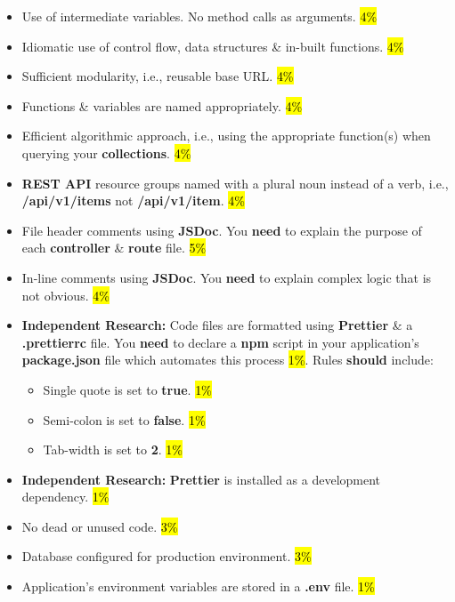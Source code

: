 \documentclass{article}
\begin{document}
\begin{itemize}
  \item Use of intermediate variables. No method calls as arguments. \hl{4\%}
  \item Idiomatic use of control flow, data structures \& in-built functions. \hl{4\%}
  \item Sufficient modularity, i.e., reusable base URL. \hl{4\%}
  \item Functions \& variables are named appropriately. \hl{4\%}
  \item Efficient algorithmic approach, i.e., using the appropriate function(s) when querying your \textbf{collections}. \hl{4\%}
  \item \textbf{REST API} resource groups named with a plural noun instead of a verb, i.e., \textbf{/api/v1/items} not \textbf{/api/v1/item}. \hl{4\%}
  \item File header comments using \textbf{JSDoc}. You \textbf{need} to explain the purpose of each \textbf{controller} \& \textbf{route} file. \hl{5\%}
  \item In-line comments using \textbf{JSDoc}. You \textbf{need} to explain complex logic that is not obvious. \hl{4\%}
  \item \textbf{Independent Research:} Code files are formatted using \textbf{Prettier} \& a \textbf{.prettierrc} file. You \textbf{need} to declare a \textbf{npm} script in your application's \textbf{package.json} file which automates this process \hl{1\%}. Rules \textbf{should} include:
        \begin{itemize}
          \item Single quote is set to \textbf{true}. \hl{1\%}
          \item Semi-colon is set to \textbf{false}. \hl{1\%}
          \item Tab-width is set to \textbf{2}. \hl{1\%}
        \end{itemize}
  \item \textbf{Independent Research:} \textbf{Prettier} is installed as a development dependency. \hl{1\%}
  \item No dead or unused code. \hl{3\%}
  \item Database configured for production environment. \hl{3\%}
  \item Application's environment variables are stored in a \textbf{.env} file. \hl{1\%}
\end{itemize}
\end{document}
